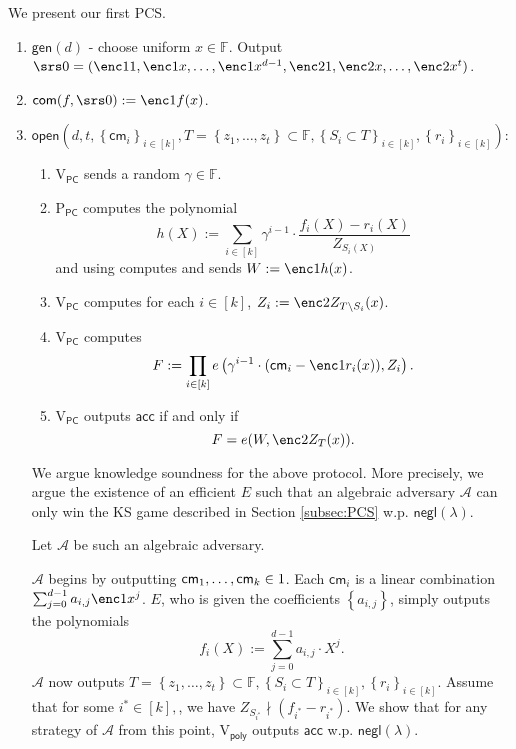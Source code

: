 \documentclass[11pt]{article} %
\newcommand{\F}{\ensuremath{\mathbb F}\xspace}
\newcommand{\adv}{\ensuremath{\mathcal A}\xspace}
\newcommand{\com}{\ensuremath{\mathsf{com}}\xspace}
\newcommand{\cm}{\ensuremath{\mathsf{cm}}\xspace}
\newcommand{\open}{\ensuremath{\mathsf{open}}\xspace}
\newcommand{\negl}{\ensuremath{\mathsf{negl}(\lambda)}\xspace}
\newcommand{\acc}{\ensuremath{\mathsf{acc}}\xspace}
\newcommand{\defeq}{:=}
\newcommand{\sett}[2]{\ensuremath{\set{#1}_{#2}}\xspace}
\newcommand{\gen}{\ensuremath{\mathsf{gen}}\xspace}
\newcommand{\prvpc}{\ensuremath{\mathrm{P_{\mathsf{PC}}}}\xspace}
\newcommand{\verpoly}{\ensuremath{\mathrm{V_{\mathsf{poly}}}}\xspace}
\newcommand{\verpc}{\ensuremath{\mathrm{V_{\mathsf{PC}}}}\xspace}
\newcommand{\ext}{\ensuremath{E}\xspace}
\newcommand{\set}[1]{\ensuremath{\left\{#1\right\}}\xspace}
\newcommand{\polysofdeg}[1]{\ensuremath{\F_{< #1}[X]}\xspace}
\begin{document}
We present our first PCS.
\begin{enumerate}
 \item $\gen(d)$ - choose uniform $x\in \F$. Output $\srs0 =(\enc1{1},\enc1{x},\ldots,\enc1{x^{d-1}},\enc2{1},\enc2{x},\ldots,\enc2{x^t})$.
 \item $\com(f,\srs0) \defeq \enc1{f(x)}$.
 \item
 \noindent
 $\open\left(d,t,\sett{\cm_i}{i\in [k]},T=\set{z_1,\ldots,z_t}\subset \F,\sett{S_i\subset T}{i\in [k]},\sett{r_{i}}{i\in [k]}\right)$:
 \begin{enumerate}
  \item \verpc sends a random $\gamma\in \F$.
 \item \prvpc computes the polynomial
 \[h(X)\defeq \sum_{i\in [k]} \gamma^{i-1}\cdot \frac{f_i(X)-r_i(X)}{Z_{S_i(X)}}  \]
 and using  computes and sends $W\defeq \enc1{h(x)}$.
 \item\label{step:computeW} \verpc computes for each $i\in [k]$, $Z_i \defeq \enc2{Z_{T\setminus S_i}(x)}$.
 \item \verpc computes
 \[F\defeq \prod_{i\in [k]} e\left(\gamma^{i-1} \cdot (\cm_i-\enc1{r_i(x)}), Z_i\right).\]
 \item \verpc outputs \acc if and only if
 \[ F = e(W,\enc2{Z_T(x)}).\]
 \end{enumerate}

 We argue knowledge soundness for the above protocol. More precisely, we argue the existence of an efficient \ext such that an algebraic adversary \adv can only win the KS game described in Section \ref{subsec:PCS} w.p. \negl.


 Let \adv be such an algebraic adversary.

 \adv begins by outputting $\cm_1,\ldots,\cm_k\in \G1$.
 Each $\cm_i$ is a linear combination $\sum_{j=0}^{d-1} a_{i,j} \enc1{x^j}$.
 \ext, who is given the coefficients \set{a_{i,j}}, simply outputs the polynomials
 \[f_i(X)\defeq \sum_{j=0}^{d-1} a_{i,j} \cdot X^j.\]
 \adv now outputs $T=\set{z_1,\ldots,z_t}\subset \F,\sett{S_i\subset T}{i\in [k]},\sett{r_{i}}{i\in [k]}$.
  Assume that for some $i^*\in [k],$, we have $Z_{S_{i^*}}\nmid (f_{i^*}- r_{i^*})$. We show that for any strategy of \adv from this point, \verpoly outputs \acc w.p. \negl.


\end{enumerate}
\end{document}
